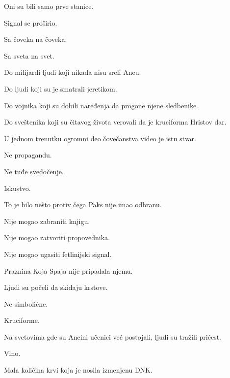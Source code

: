 \bigskip

Oni su bili samo prve stanice.

\bigskip

Signal se proširio.

\bigskip

Sa čoveka na čoveka.

Sa sveta na svet.

\bigskip

Do milijardi ljudi koji nikada nisu sreli Aneu.

\bigskip

Do ljudi koji su je smatrali jeretikom.

Do vojnika koji su dobili naređenja da progone njene sledbenike.

Do sveštenika koji su čitavog života verovali da je kruciforma Hristov dar.

\bigskip

U jednom trenutku ogromni deo čovečanstva video je istu stvar.

\bigskip

Ne propagandu.

Ne tuđe svedočenje.

\bigskip

Iskustvo.

\bigskip

To je bilo nešto protiv čega Paks nije imao odbranu.

\bigskip

Nije mogao zabraniti knjigu.

Nije mogao zatvoriti propovednika.

Nije mogao ugasiti fetlinijski signal.

\bigskip

Praznina Koja Spaja nije pripadala njemu.

\bigskip

Ljudi su počeli da skidaju krstove.

\bigskip

Ne simbolične.

\bigskip

Kruciforme.

\bigskip

Na svetovima gde su Aneini učenici već postojali, ljudi su tražili pričest.

\bigskip

Vino.

Mala količina krvi koja je nosila izmenjenu DNK.

\bigskip

